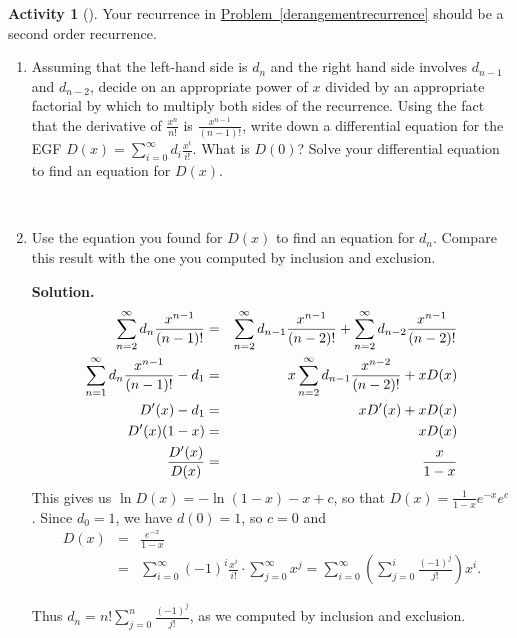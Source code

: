\documentclass[10pt,]{book}
\theoremstyle{plain}
\theoremstyle{definition}
\newtheorem{activity}[project]{Activity}
\numberwithin{equation}{chapter}
\newcommand{\amp}{&}
\begin{document}
\begin{activity}[]\label{exponentialderangements}
Your recurrence in \hyperref[derangementrecurrence]{Problem~\ref{derangementrecurrence}} should be a second order recurrence.%
~\par
\begin{enumerate}[label=(\alph*)]
 \item Assuming that the left-hand side is \(d_n\) and the right hand side involves \(d_{n-1}\) and \(d_{n-2}\), decide on an appropriate power of \(x\) divided by an appropriate factorial by which to multiply both sides of the recurrence.  Using the fact that the derivative of \(\frac{x^n}{n!}\) is \(\frac{x^{n-1}}{(n-1)!}\), write down a differential equation for the EGF \(D(x) =
\sum_{i=0}^\infty d_i\frac{x^i}{i!}\). What is \(D(0)\)?  Solve your differential equation to find an equation for \(D(x)\).%

~\par
\item Use the equation you found for \(D(x)\) to find an equation for \(d_n\).  Compare this result with the one you computed by inclusion and exclusion.%
\par\medskip\noindent%
\textbf{Solution.}\quad %
\begin{align*}
\sum_{n=2}^\infty d_n\frac{x^{n-1}}{(n-1)!}
\amp =\amp \sum_{n=2}^\infty d_{n-1}\frac{x^{n-1}}{(n-2)!} +\sum_{n=2}^\infty
d_{n-2}\frac{x^{n-1}}{(n-2)!}\\
\sum_{n=1}^\infty d_n\frac{x^{n-1}}{(n-1)!} -d_1 \amp =\amp
x\sum_{n=2}^\infty d_{n-1}\frac{x^{n-2}}{(n-2)!} +xD(x)\\
D'(x) -d_1 \amp =\amp  xD'(x) +xD(x)\\
D'(x)(1-x) \amp =\amp  xD(x)\\
D'(x)\over D(x) \amp =\amp  x\over 1-x
\end{align*}
This gives us \(\ln D(x) = -\ln(1-x) -x +c\), so that \(D(x) = \frac{1}{1-x}e^{-x}e^c\). Since \(d_0=1\), we have \(d(0)=1\), so \(c=0\) and%
\begin{align*}
D(x) \amp =\amp  \frac{e^{-x}}{1-x}\\
\amp =\amp
\sum_{i=0}^\infty(-1)^i\frac{x^i}{i!}\cdot\sum_{j=0}^\infty
x^j=\sum_{i=0}^\infty\left(\sum_{j=0}^i \frac{(-1)^j}{j!}\right)
x^i.
\end{align*}
%
\par
Thus \(d_n = n!\sum_{j=0}^n\frac{(-1)^j}{j!}\), as we computed by inclusion and exclusion.%

\end{enumerate}
\end{activity}
\typeout{************************************************}
\typeout{************************************************}
\end{document}
